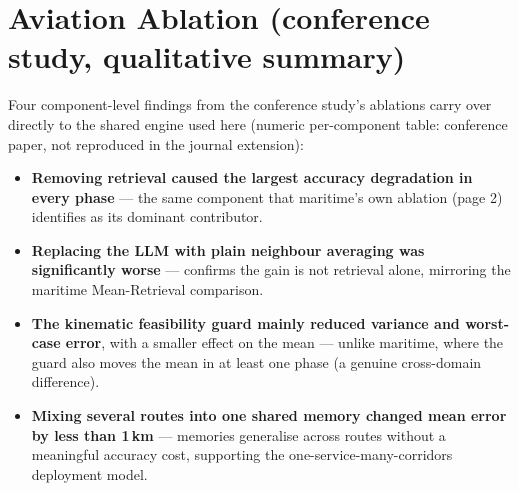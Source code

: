 \documentclass[10pt]{article}
\begin{document}
\section*{Aviation Ablation (conference study, qualitative summary)}

\begin{center}
\end{center}

Four component-level findings from the conference study's ablations carry
over directly to the shared engine used here (numeric per-component table:
conference paper, not reproduced in the journal extension):
\begin{itemize}[leftmargin=14pt, itemsep=1pt, topsep=2pt]
\item \textbf{Removing retrieval caused the largest accuracy degradation in every phase} --- the same component that maritime's own ablation (page 2) identifies as its dominant contributor.
\item \textbf{Replacing the LLM with plain neighbour averaging was significantly worse} --- confirms the gain is not retrieval alone, mirroring the maritime Mean-Retrieval comparison.
\item \textbf{The kinematic feasibility guard mainly reduced variance and worst-case error}, with a smaller effect on the mean --- unlike maritime, where the guard also moves the mean in at least one phase (a genuine cross-domain difference).
\item \textbf{Mixing several routes into one shared memory changed mean error by less than 1\,km} --- memories generalise across routes without a meaningful accuracy cost, supporting the one-service-many-corridors deployment model.
\end{itemize}
\end{document}
